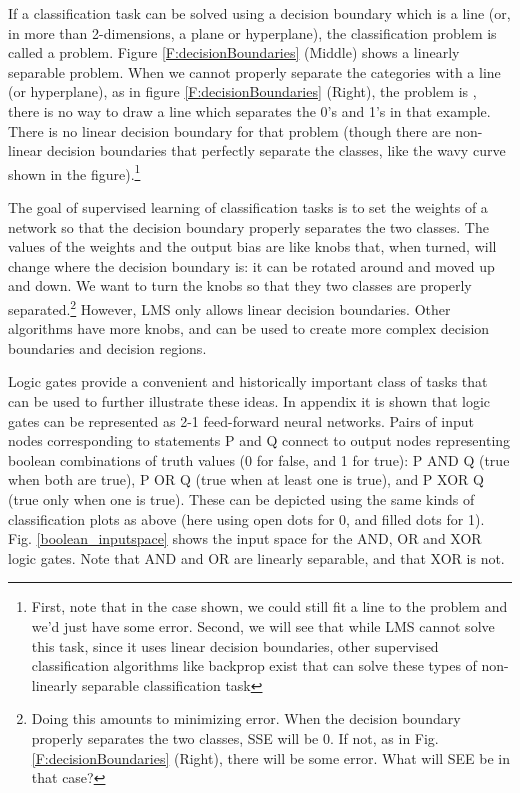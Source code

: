 If a classification task can be solved using a decision boundary which is a line (or, in more than 2-dimensions, a plane or hyperplane), the classification problem is called a  problem. Figure \ref{F:decisionBoundaries} (Middle) shows a linearly separable problem. When we cannot properly separate the categories with a line (or hyperplane), as in figure \ref{F:decisionBoundaries} (Right), the problem is , there is no way to draw a line which separates the 0's and 1's in that example. There is no linear decision boundary for that problem (though there are non-linear decision boundaries that perfectly separate the classes, like the wavy curve shown in the figure).\footnote{First, note that in the case shown, we could still fit a line to the problem and we'd just have some error. Second, we will see that while LMS cannot solve this task, since it uses linear decision boundaries, other supervised classification algorithms like backprop exist that can solve these types of non-linearly separable classification task}

The goal of supervised learning of classification tasks is to set the weights of a network so that the decision boundary properly separates the two classes. The values of the weights and the output bias are like knobs that, when turned, will change where the decision boundary is: it can be rotated around and moved up and down. We want to turn the knobs so that they two  classes are properly separated.\footnote{Doing this amounts to minimizing error. When the decision boundary properly separates the two classes, SSE will be 0. If not, as in Fig. \ref{F:decisionBoundaries} (Right), there will be some error. What will SEE be in that case?}  However, LMS only allows linear decision boundaries. Other algorithms have more knobs, and can be used to create more complex decision boundaries and decision regions.
  
Logic gates provide a convenient and historically important class of tasks that can be used to further illustrate these ideas. In appendix  it is shown that logic gates can be represented as 2-1 feed-forward neural networks. Pairs of input nodes corresponding to statements P and Q connect to output nodes representing boolean combinations of truth values (0 for false, and 1 for true): P AND Q (true when both are true), P OR Q (true when at least one is true), and P XOR Q (true only when one is true). These can be depicted using the same kinds of classification plots as above (here using open dots for 0, and filled dots for 1). Fig. \ref{boolean_inputspace} shows the input space for the AND, OR and XOR logic gates. Note that AND and OR are linearly separable, and that XOR is not.

